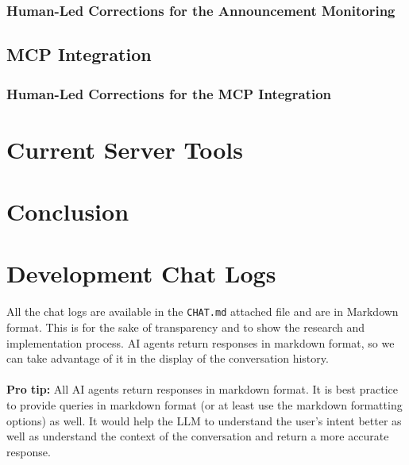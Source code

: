 \documentclass[11pt,a4paper]{article}
\begin{document}
\subsubsection{Human-Led Corrections for the Announcement Monitoring}

\subsection{MCP Integration}

\subsubsection{Human-Led Corrections for the MCP Integration}


\section{Current Server Tools}


\section{Conclusion}
\appendix
\vspace{2cm}
\section*{Development Chat Logs}
All the chat logs are available in the \texttt{CHAT.md} attached file and are in Markdown format. This is for the sake of transparency and to show the research and implementation process. AI agents return responses in markdown format, so we can take advantage of it in the display of the conversation history. 
\\\\
\textbf{Pro tip:} All AI agents return responses in markdown format. It is best practice to provide queries in markdown format (or at least use the markdown formatting options) as well. It would help the LLM to understand the user's intent better as well as understand the context of the conversation and return a more accurate response.
\end{document}
